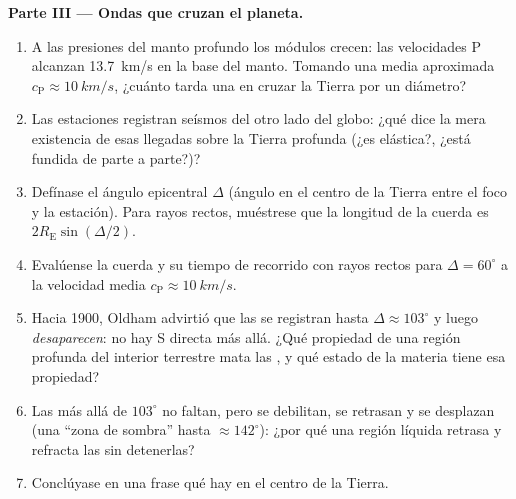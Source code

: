 \begin{problem}
\medskip\noindent\textbf{Parte III --- Ondas que cruzan el planeta.}
\begin{enumerate}[resume]
  \item A las presiones del manto profundo los módulos crecen: las
        velocidades P alcanzan \qty{13.7}{km/s} en la base del manto.
        Tomando una media aproximada $c_{\text{P}} \approx \qty{10}{km/s}$,
        ¿cuánto tarda una  en cruzar la Tierra por un diámetro?
  \item Las estaciones registran seísmos del otro lado del globo: ¿qué
        dice la mera existencia de esas llegadas sobre la Tierra
        profunda (¿es elástica?, ¿está fundida de parte a parte?)?
  \item Defínase el ángulo epicentral $\Delta$ (ángulo en el centro de la
        Tierra entre el foco y la estación). Para rayos rectos,
        muéstrese que la longitud de la cuerda es
        $2R_{\text{E}}\sin(\Delta/2)$.
  \item Evalúense la cuerda y su tiempo de recorrido con rayos rectos para
        $\Delta = 60^\circ$ a la velocidad media $c_{\text{P}} \approx
        \qty{10}{km/s}$.
  \item Hacia 1900, Oldham advirtió que las  se registran hasta
        $\Delta \approx 103^\circ$ y luego \emph{desaparecen}: no hay
        S directa más allá. ¿Qué propiedad de una región profunda del
        interior terrestre mata las , y qué estado de la materia
        tiene esa propiedad?
  \item Las  más allá de $103^\circ$ no faltan, pero se
        debilitan, se retrasan y se desplazan (una ``zona de sombra''
        hasta $\approx 142^\circ$): ¿por qué una región líquida retrasa
        y refracta las  sin detenerlas?
  \item Conclúyase en una frase qué hay en el centro de la Tierra.
\end{enumerate}


\end{problem}
